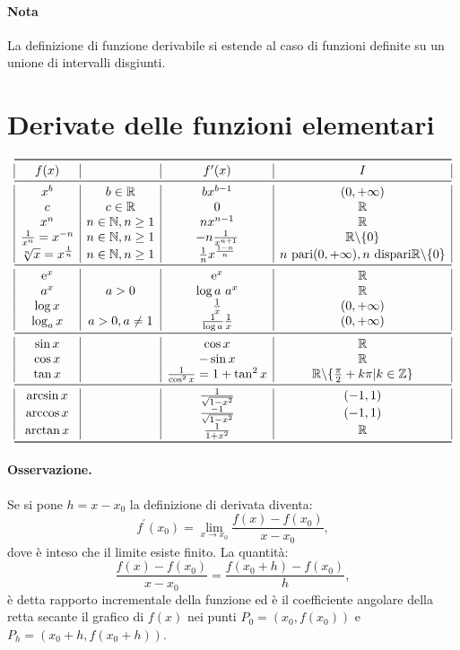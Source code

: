 \paragraph*{Nota} La definizione di funzione derivabile si estende al caso di funzioni definite su un unione di intervalli disgiunti.

\section{Derivate delle funzioni elementari}
\begin{equation*}
\begin{array}{ |*{4}{c|} }
\toprule
f(x) & & f^\prime(x) & I \\
\midrule
x^b & b\in\R        & bx^{b-1} & (0,+\infty) \\
c   & c\in\R        & 0        & \R          \\
x^n & n\in\N,n\geq1 & nx^{n-1} & \R          \\
\frac{1}{x^n}=x^{-n} & n\in\N,n\geq1 & -n\frac{1}{x^{n+1}} & \R \backslash\{0\} \\
\sqrt[n]{x} = x^{\frac{1}{n}} & n\in\N,n\geq1 & \frac{1}{n} x^{\frac{1-n}{n}} & n\text{ pari}(0,+\infty),n \text{ dispari} \R\backslash\{0\} \\
\midrule
\e^x & & \e^x & \R \\
a^x & a>0 & \log a \text{ } a^x & \R \\
\log x & & \frac{1}{x} & (0,+\infty) \\
\log_a x & a>0,a\neq 1 & \frac{1}{\log a}\frac{1}{x} & (0,+\infty) \\
\midrule
\sin x & & \cos x & \R \\
\cos x & & -\sin x & \R \\
\tan x & & \frac{1}{\cos^2 x}=1+\tan^2 x & \R\backslash\{\frac{\pi}{2}+k\pi | k\in \Z\} \\
\midrule
\arcsin x & & \frac{1}{\sqrt{1-x^2}} & (-1,1) \\
\arccos x & & \frac{-1}{\sqrt{1-x^2}} & (-1,1) \\
\arctan x & & \frac{1}{1+x^2} & \R \\
\bottomrule
\end{array}
\end{equation*}

\paragraph{Osservazione.}
Se si pone $h=x-x_0$ la definizione di derivata diventa:
\[f^\prime(x_0)=\lim_{x\to x_0} \frac{f(x)-f(x_0)}{x-x_0},\]
dove è inteso che il limite esiste finito. La quantità:
\[\frac{f(x)-f(x_0)}{x-x_0}=\frac{f(x_0+h)-f(x_0)}{h},\]
è detta rapporto incrementale della funzione ed è il coefficiente angolare della retta secante il grafico di $f(x)$ nei punti $P_0=(x_0,f(x_0))$ e $P_h=(x_0+h,f(x_0+h))$.

